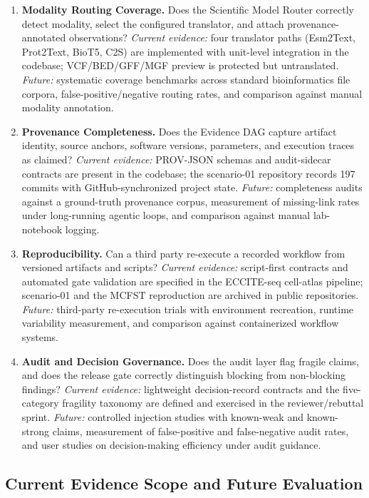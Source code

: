 \documentclass[sn-basic,Numbered,pdflatex]{sn-jnl}
\begin{document}
\begin{enumerate}[leftmargin=*,itemsep=2pt]
    \item \textbf{Modality Routing Coverage.} Does the Scientific Model Router correctly detect modality, select the configured translator, and attach provenance-annotated observations? \textit{Current evidence:} four translator paths (Esm2Text, Prot2Text, BioT5, C2S) are implemented with unit-level integration in the codebase; VCF/BED/GFF/MGF preview is protected but untranslated. \textit{Future:} systematic coverage benchmarks across standard bioinformatics file corpora, false-positive/negative routing rates, and comparison against manual modality annotation.
    \item \textbf{Provenance Completeness.} Does the Evidence DAG capture artifact identity, source anchors, software versions, parameters, and execution traces as claimed? \textit{Current evidence:} PROV-JSON schemas and audit-sidecar contracts are present in the codebase; the scenario-01 repository records 197 commits with GitHub-synchronized project state. \textit{Future:} completeness audits against a ground-truth provenance corpus, measurement of missing-link rates under long-running agentic loops, and comparison against manual lab-notebook logging.
    \item \textbf{Reproducibility.} Can a third party re-execute a recorded workflow from versioned artifacts and scripts? \textit{Current evidence:} script-first contracts and automated gate validation are specified in the ECCITE-seq cell-atlas pipeline; scenario-01 and the MCFST reproduction are archived in public repositories. \textit{Future:} third-party re-execution trials with environment recreation, runtime variability measurement, and comparison against containerized workflow systems.
    \item \textbf{Audit and Decision Governance.} Does the audit layer flag fragile claims, and does the release gate correctly distinguish blocking from non-blocking findings? \textit{Current evidence:} lightweight decision-record contracts and the five-category fragility taxonomy are defined and exercised in the reviewer/rebuttal sprint. \textit{Future:} controlled injection studies with known-weak and known-strong claims, measurement of false-positive and false-negative audit rates, and user studies on decision-making efficiency under audit guidance.
\end{enumerate}

\subsection{Current Evidence Scope and Future Evaluation}
\end{document}

